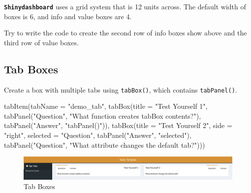 \documentclass[
  oneside]{book}
\newenvironment{Shaded}{\begin{snugshade}}{\end{snugshade}}
\newcommand{\AttributeTok}[1]{\textcolor[rgb]{0.77,0.63,0.00}{#1}}
\newcommand{\DecValTok}[1]{\textcolor[rgb]{0.00,0.00,0.81}{#1}}
\newcommand{\FunctionTok}[1]{\textcolor[rgb]{0.00,0.00,0.00}{#1}}
\newcommand{\NormalTok}[1]{#1}
\newcommand{\StringTok}[1]{\textcolor[rgb]{0.31,0.60,0.02}{#1}}
\begin{document}
\textbf{\texttt{Shinydashboard}} uses a grid system that is \DecValTok{12} units across. The default width of boxes is \DecValTok{6}, and info and value boxes are \DecValTok{4}.

\begin{try}
Try to write the code to create the second row of info boxes show above and the third row of value boxes.

\end{try}

\hypertarget{tab-boxes}{%
\subsection{Tab Boxes}\label{tab-boxes}}

Create a box with multiple tabs using \texttt{tabBox}\texttt{()}, which contains \texttt{tabPanel}\texttt{()}.

\begin{Shaded}
\begin{Highlighting}[]
\FunctionTok{tabItem}\NormalTok{(}\AttributeTok{tabName =} \StringTok{"demo\_tab"}\NormalTok{, }\FunctionTok{tabBox}\NormalTok{(}\AttributeTok{title =} \StringTok{"Test Yourself 1"}\NormalTok{, }\FunctionTok{tabPanel}\NormalTok{(}\StringTok{"Question"}\NormalTok{,}
    \StringTok{"What function creates tabBox contents?"}\NormalTok{), }\FunctionTok{tabPanel}\NormalTok{(}\StringTok{"Answer"}\NormalTok{, }\StringTok{"tabPanel()"}\NormalTok{)),}
    \FunctionTok{tabBox}\NormalTok{(}\AttributeTok{title =} \StringTok{"Test Yourself 2"}\NormalTok{, }\AttributeTok{side =} \StringTok{"right"}\NormalTok{, }\AttributeTok{selected =} \StringTok{"Question"}\NormalTok{, }\FunctionTok{tabPanel}\NormalTok{(}\StringTok{"Answer"}\NormalTok{,}
        \StringTok{"selected"}\NormalTok{), }\FunctionTok{tabPanel}\NormalTok{(}\StringTok{"Question"}\NormalTok{, }\StringTok{"What attribute changes the default tab?"}\NormalTok{)))}
\end{Highlighting}
\end{Shaded}

\begin{figure}

{\centering \includegraphics[width=1\linewidth]{images/sdb_tab_box} 

}

\caption{Tab Boxes}\label{fig:sdb-tab-box}
\end{figure}
\end{document}
